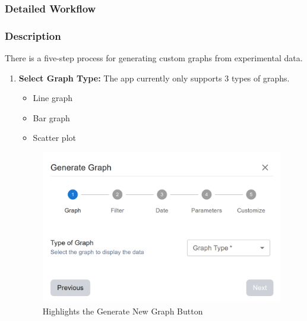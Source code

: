 \documentclass[12pt]{article}
\begin{document}
\subsubsection{Detailed Workflow}
\subsubsection*{Description}
There is a five-step process for generating custom graphs from experimental data.

\begin{enumerate}
    \item \textbf{Select Graph Type:} \newline
    The app currently only supports 3 types of graphs. 
    \begin{itemize}
        \item Line graph 
        \item Bar graph 
        \item Scatter plot
    \end{itemize}
    \begin{figure}[H]
        \centering
        \includegraphics[scale=0.4]{Images/graph-form .png}
        \caption{Highlights the Generate New Graph Button}
        \label{fig:example}
    \end{figure}


\end{enumerate}
\end{document}
